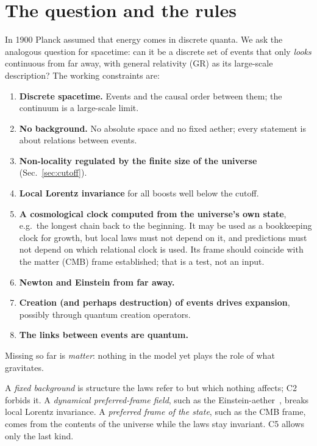 \documentclass[11pt,a4paper]{article}
\newcommand{\tagbox}[2]{\textsf{\scriptsize\colorbox{#1!12}{\textcolor{#1!70!black}{#2}}}}
\newcommand{\est}{\tagbox{gray}{established}}
\begin{document}
\section{The question and the rules}
In 1900 Planck assumed that energy comes in discrete quanta. We ask the analogous question for spacetime: can it be a discrete set of events that only \emph{looks} continuous from far away, with general relativity (GR) as its large-scale description? The working constraints are:
\begin{enumerate}[label=\textbf{C\arabic*},leftmargin=*,itemsep=1pt]
\item \textbf{Discrete spacetime.} Events and the causal order between them; the continuum is a large-scale limit.
\item \textbf{No background.} No absolute space and no fixed aether; every statement is about relations between events.
\item \textbf{Non-locality regulated by the finite size of the universe} (Sec.~\ref{sec:cutoff}).
\item \textbf{Local Lorentz invariance} for all boosts well below the cutoff.
\item \textbf{A cosmological clock computed from the universe's own state}, e.g.\ the longest chain back to the beginning. It may be used as a bookkeeping clock for growth, but local laws must not depend on it, and predictions must not depend on which relational clock is used. Its frame should coincide with the matter (CMB) frame \est; that is a test, not an input.
\item \textbf{Newton and Einstein from far away.}
\item \textbf{Creation (and perhaps destruction) of events drives expansion}, possibly through quantum creation operators.
\item \textbf{The links between events are quantum.}
\end{enumerate}
Missing so far is \emph{matter}: nothing in the model yet plays the role of what gravitates.

A \emph{fixed background} is structure the laws refer to but which nothing affects; C2 forbids it. A \emph{dynamical preferred-frame field}, such as the Einstein-aether~\cite{JacobsonMattingly01}, breaks local Lorentz invariance. A \emph{preferred frame of the state}, such as the CMB frame, comes from the contents of the universe while the laws stay invariant. C5 allows only the last kind.
\end{document}
